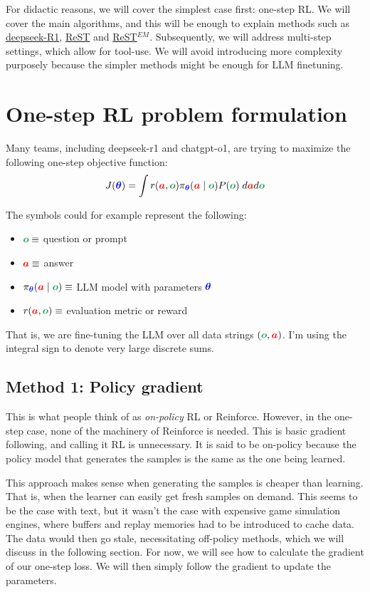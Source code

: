 \documentclass{article}
\newcommand{\colsym}[2]{\ensuremath{\textcolor{#1}{\boldsymbol{#2}}}}
\newcommand{\action}{\colsym{red}{a}}
\newcommand{\obs}{\colsym{ForestGreen}{o}}
\newcommand{\params}{\colsym{blue}{\theta}}
\begin{document}
For didactic reasons, we will cover the simplest case first: one-step RL. We will cover the main algorithms, and this will be enough to explain methods such as \href{https://arxiv.org/abs/2501.12948}{deepseek-R1}, \href{https://arxiv.org/abs/2308.08998}{ReST} and \href{https://arxiv.org/abs/2312.06585}{ReST$^{EM}$}. Subsequently, we will address multi-step settings, which allow for tool-use. We will avoid introducing more complexity purposely because the simpler methods might be enough for LLM finetuning.



\section{One-step RL problem formulation}


Many teams, including deepseek-r1 and chatgpt-o1, are trying to maximize the following one-step objective function:
\[
J(\params) = \int r(\action, \obs) \pi_{\params}(\action \mid \obs) P(\obs) \; d\action d\obs
\]

The symbols could for example represent the following:
\begin{itemize}
    \item $\obs \equiv$ question or prompt
    \item $\action \equiv$ answer
    \item $\pi_{\params}(\action \mid \obs) \equiv$ LLM model with parameters $\params$
    \item $r(\action, \obs) \equiv$ evaluation metric or reward
\end{itemize}

That is, we are fine-tuning the LLM over all data strings $(\obs, \action)$. I’m using the integral sign to denote very large discrete sums.


\subsection{Method 1: Policy gradient}

This is what people think of as \emph{on-policy} RL or Reinforce. However, in the one-step case, none of the machinery of Reinforce is needed. This is basic gradient following, and calling it RL is unnecessary. It is said to be on-policy because the policy model that generates the samples is the same as the one being learned.

This approach makes sense when generating the samples is cheaper than learning. That is, when the learner can easily get fresh samples on demand. This seems to be the case with text, but it wasn't the case with expensive game simulation engines, where buffers and replay memories had to be introduced to cache data. The data would then go stale, necessitating off-policy methods, which we will discuss in the following section. For now, we will see how to calculate the gradient of our one-step loss. We will then simply follow the gradient to update the parameters.
\end{document}
